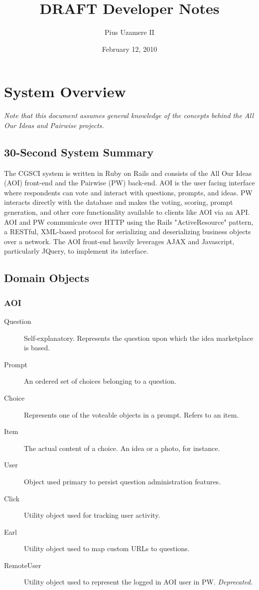 \documentclass[11pt]{book}
\title{DRAFT Developer Notes}
\author{Pius Uzamere II}
\date{February 12, 2010}
\begin{document}
\maketitle

\chapter{System Overview}

\emph{Note that this document assumes general knowledge of the concepts behind the All Our Ideas and Pairwise projects.}

\section{30-Second System Summary}
The CGSCI system is written in Ruby on Rails and consists of the All Our Ideas (AOI) front-end and the Pairwise (PW) back-end.  AOI is the user facing interface where respondents can vote and interact with questions, prompts, and ideas.  PW interacts directly with the database and makes the voting, scoring, prompt generation, and other core functionality available to clients like AOI via an API.  AOI and PW communicate over HTTP using the Rails "ActiveResource" pattern, a RESTful, XML-based protocol for serializing and deserializing business objects over a network.  The AOI front-end heavily leverages AJAX and Javascript, particularly JQuery, to implement its interface.

\section{Domain Objects}

\subsection{AOI}

\begin{description}
\item[Question] Self-explanatory. Represents the question upon which the idea marketplace is based.
\item[Prompt] An ordered set of choices belonging to a question.
\item[Choice] Represents one of the voteable objects in a prompt.  Refers to an item.
\item[Item] The actual content of a choice.  An idea or a photo, for instance.
\item[User] Object used primary to persist question administration features.
\item[Click] Utility object used for tracking user activity.
\item[Earl] Utility object used to map custom URLs to questions.
\item[RemoteUser]  Utility object used to represent the logged in AOI user in PW.  \emph{Deprecated.}
\end{description}
\end{document}
